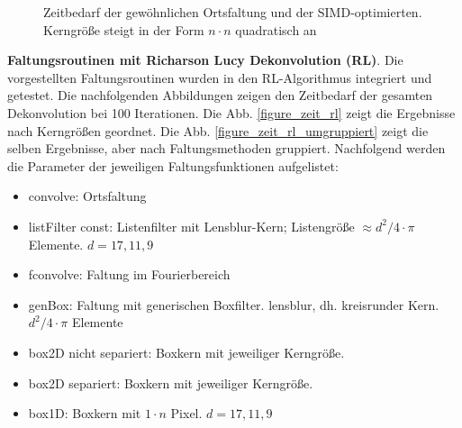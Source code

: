 \documentclass[a4paper,12pt]{article}
\begin{document}
\begin{figure}[htbp]
\caption{Zeitbedarf der gewöhnlichen Ortsfaltung und der SIMD-optimierten.
Kerngröße steigt in der Form $n \cdot n$ quadratisch an}%
\label{figure_simd_vs_con_quadtrat}
\end{figure}

\textbf{Faltungsroutinen mit Richarson Lucy Dekonvolution (RL)}.
Die vorgestellten Faltungsroutinen wurden in den RL-Algorithmus integriert und
getestet. Die nachfolgenden Abbildungen zeigen den Zeitbedarf der gesamten
Dekonvolution bei 100 Iterationen. Die Abb. \ref{figure_zeit_rl} zeigt die
Ergebnisse nach Kerngrößen geordnet. Die Abb. \ref{figure_zeit_rl_umgruppiert}
zeigt die selben Ergebnisse, aber nach Faltungsmethoden gruppiert. Nachfolgend
werden die Parameter der jeweiligen Faltungsfunktionen aufgelistet:
\begin{itemize}
  \itemsep -1pt
  \item convolve: Ortsfaltung
  \item listFilter const: Listenfilter mit Lensblur-Kern; 
  Listengröße $\approx d^{2}/4 \cdot \pi$ Elemente. $d = 17, 11,9$
  \item fconvolve: Faltung im Fourierbereich
  \item genBox: Faltung mit generischen Boxfilter. lensblur, dh. kreisrunder
  Kern. $d^{2}/4 \cdot \pi$ Elemente
  \item box2D nicht separiert: Boxkern mit jeweiliger Kerngröße.
  \item box2D separiert: Boxkern mit jeweiliger Kerngröße.
  \item box1D: Boxkern mit $1 \cdot n$ Pixel. $d = 17,11,9$
     
\end{itemize}
\end{document}
